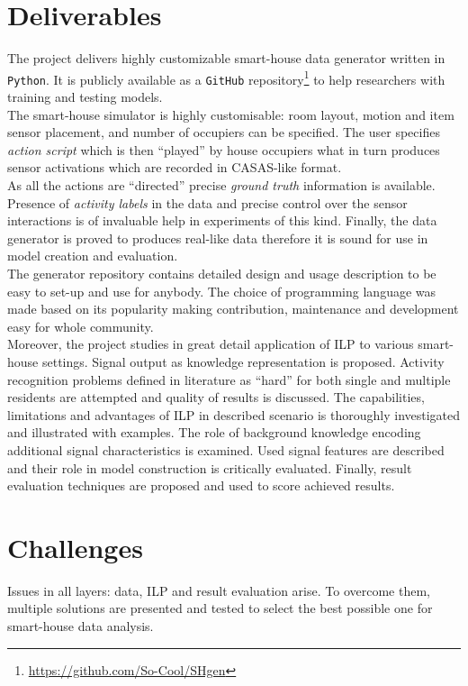 \documentclass[11pt, a4paper, pdflatex, leqno, twoside, openright]{report}
\begin{document}
\section{Deliverables}
The project delivers highly customizable smart-house data generator written in \texttt{Python}. It is publicly available as a \texttt{GitHub} repository\footnote{\noindent\url{https://github.com/So-Cool/SHgen}} to help researchers with training and testing models.\\
The smart-house simulator is highly customisable: room layout, motion and item sensor placement, and number of occupiers can be specified. The user specifies \emph{action script} which is then ``played'' by house occupiers what in turn produces sensor activations which are recorded in CASAS-like format.\\
As all the actions are ``directed'' precise \emph{ground truth} information is available. Presence of \emph{activity labels} in the data and precise control over the sensor interactions is of invaluable help in experiments of this kind. Finally, the data generator is proved to produces real-like data therefore it is sound for use in model creation and evaluation.\\
The generator repository contains detailed design and usage description to be easy to set-up and use for anybody. The choice of programming language was made based on its popularity making contribution, maintenance and development easy for whole community.\\

Moreover, the project studies in great detail application of ILP to various smart-house settings. Signal output as knowledge representation is proposed. Activity recognition problems defined in literature as ``hard'' for both single and multiple residents are attempted and quality of results is discussed. The capabilities, limitations and advantages of ILP in described scenario is thoroughly investigated and illustrated with examples. The role of background knowledge encoding additional signal characteristics is examined. Used signal features are described and their role in model construction is critically evaluated. Finally, result evaluation techniques are proposed and used to score achieved results.

\section{Challenges}
Issues in all layers: data, ILP and result evaluation arise. To overcome them, multiple solutions are presented and tested to select the best possible one for smart-house data analysis.\\
\end{document}
